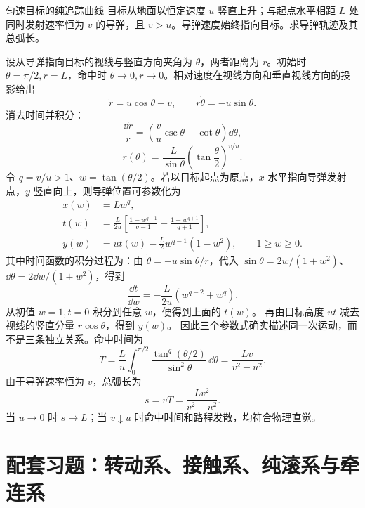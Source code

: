\begin{practicebox}{匀速目标的纯追踪曲线}
目标从地面以恒定速度 $u$ 竖直上升；与起点水平相距 $L$ 处同时发射速率恒为 $v$ 的导弹，且 $v>u$。导弹速度始终指向目标。求导弹轨迹及其总弧长。
\label{r2ch01:pr:007}
\begin{solution}
设从导弹指向目标的视线与竖直方向夹角为 $\theta$，两者距离为 $r$。初始时 $\theta=\pi/2,r=L$，命中时 $\theta\to0,r\to0$。相对速度在视线方向和垂直视线方向的投影给出
\[
  \dot r=u\cos\theta-v,\qquad
  r\dot\theta=-u\sin\theta.
\]
消去时间并积分：
\[
  \frac{\dd r}{r}=\left(\frac vu\csc\theta-\cot\theta\right)\dd\theta,
\]
\[
  \boxed{r(\theta)=\frac{L}{\sin\theta}
  \left(\tan\frac\theta2\right)^{v/u}}.
\]
令 $q=v/u>1$、$w=\tan(\theta/2)$。若以目标起点为原点，$x$ 水平指向导弹发射点，$y$ 竖直向上，则导弹位置可参数化为
\begin{align*}
  x(w)&=Lw^q,\\
  t(w)&=\frac{L}{2u}\left[
  \frac{1-w^{q-1}}{q-1}+\frac{1-w^{q+1}}{q+1}\right],\\
  y(w)&=ut(w)-\frac L2w^{q-1}(1-w^2),\qquad 1\geq w\geq0.
\end{align*}
其中时间函数的积分过程为：由 $\dot\theta=-u\sin\theta/r$，代入
$\sin\theta=2w/(1+w^2)$、$\dd\theta=2\dd w/(1+w^2)$，得到
\[
 \frac{\dd t}{\dd w}=-\frac{L}{2u}(w^{q-2}+w^q).
\]
从初值 $w=1,t=0$ 积分到任意 $w$，便得到上面的 $t(w)$。
再由目标高度 $ut$ 减去视线的竖直分量 $r\cos\theta$，得到 $y(w)$。
因此三个参数式确实描述同一次运动，而不是三条独立关系。命中时间为
\[
  T=\frac Lu\int_0^{\pi/2}
  \frac{\tan^q(\theta/2)}{\sin^2\theta}\,\dd\theta
  =\frac{Lv}{v^2-u^2}.
\]
由于导弹速率恒为 $v$，总弧长为
\[
  \boxed{s=vT=\frac{Lv^2}{v^2-u^2}}.
\]
当 $u\to0$ 时 $s\to L$；当 $v\downarrow u$ 时命中时间和路程发散，均符合物理直觉。
\end{solution}
\end{practicebox}

\section{配套习题：转动系、接触系、纯滚系与牵连系}
\label{r2ch01:sec:practice-frames}

